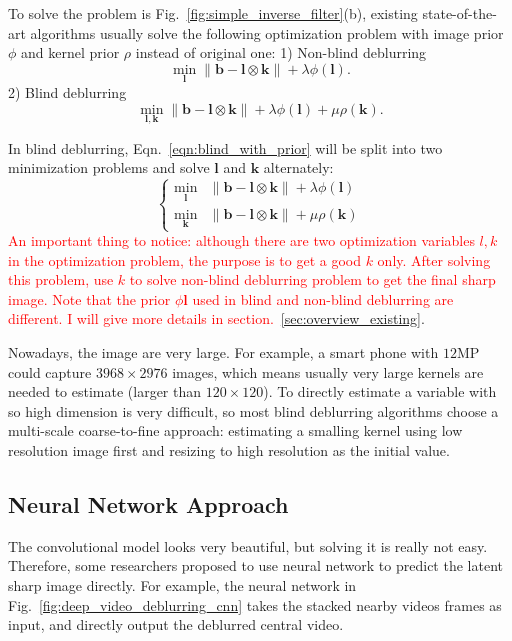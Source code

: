 \documentclass[journal, onecolumn, 10pt]{IEEEtran}
\begin{document}
To solve the problem is Fig.~\ref*{fig:simple_inverse_filter}(b), existing state-of-the-art algorithms usually solve the following optimization problem with image prior $\phi$ and kernel prior $\rho$ instead of original one: 1) Non-blind deblurring
\begin{equation}
\min_{\mathbf{l}} \| \mathbf{b} - \mathbf{l} \otimes \mathbf{k} \| + \lambda\phi(\mathbf{l}).
\label{eqn:non_blind_with_prior}
\end{equation}
2) Blind deblurring
\begin{equation}
\min_{\mathbf{l}, \mathbf{k}} \| \mathbf{b} - \mathbf{l} \otimes \mathbf{k} \| + \lambda\phi(\mathbf{l}) + \mu \rho(\mathbf{k}).
\label{eqn:blind_with_prior}
\end{equation}

In blind deblurring, Eqn.~\ref{eqn:blind_with_prior} will be split into two minimization problems and solve  $\mathbf{l}$ and $\mathbf{k}$ alternately:
\begin{equation}
\begin{cases}
\min_{\mathbf{l}}&\| \mathbf{b} - \mathbf{l} \otimes \mathbf{k} \| + \lambda\phi(\mathbf{l}) \\
\min_{\mathbf{k}}&\| \mathbf{b} - \mathbf{l} \otimes \mathbf{k} \| + \mu \rho(\mathbf{k})
\end{cases}
\label{eqn:blind_with_prior_alternate}
\end{equation}
\textcolor{red}{An important thing to notice: although there are two optimization variables $l,k$ in the optimization problem, the purpose is to get a good $k$ only. After solving this problem, use $k$ to solve non-blind deblurring problem to get the final sharp image. Note that the prior $\phi{\mathbf{l}}$ used in blind and non-blind deblurring are different. I will give more details in section.~\ref{sec:overview_existing}}.

Nowadays, the image are very large. For example, a smart phone with $12$MP could capture $3968 \times 2976$ images, which means usually very large kernels are needed to estimate (larger than $120 \times 120$). To directly estimate a variable with so high dimension is very difficult, so most blind deblurring algorithms choose a multi-scale coarse-to-fine approach: estimating a smalling kernel using low resolution image first and resizing to high resolution as the initial value.


\subsection{Neural Network Approach}
The convolutional model looks very beautiful, but solving it is really not easy. Therefore, some researchers proposed to use neural network to predict the latent sharp image directly. For example, the neural network in Fig.~\ref{fig:deep_video_deblurring_cnn} takes the stacked nearby videos frames as input, and directly output the deblurred central video. 
\end{document}
